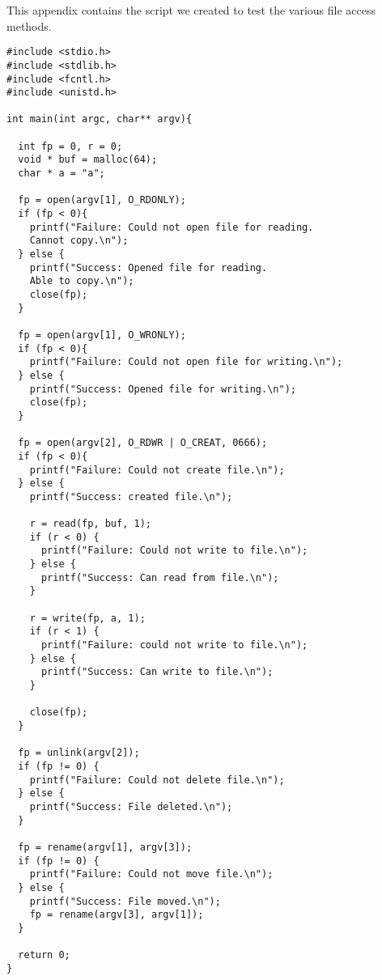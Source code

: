\label{app:A}



This appendix contains the script we created to test the various file access methods.
\selectfont
\begin{lstlisting}[style=CStyle]
#include <stdio.h>
#include <stdlib.h>
#include <fcntl.h>
#include <unistd.h>

int main(int argc, char** argv){

  int fp = 0, r = 0;
  void * buf = malloc(64);
  char * a = "a";

  fp = open(argv[1], O_RDONLY);
  if (fp < 0){
    printf("Failure: Could not open file for reading. 
    Cannot copy.\n");
  } else {
    printf("Success: Opened file for reading. 
    Able to copy.\n");
    close(fp);
  }

  fp = open(argv[1], O_WRONLY);
  if (fp < 0){
    printf("Failure: Could not open file for writing.\n");
  } else {
    printf("Success: Opened file for writing.\n");
    close(fp);
  }

  fp = open(argv[2], O_RDWR | O_CREAT, 0666);
  if (fp < 0){
    printf("Failure: Could not create file.\n");
  } else {
    printf("Success: created file.\n");

    r = read(fp, buf, 1);
    if (r < 0) {
      printf("Failure: Could not write to file.\n");
    } else {
      printf("Success: Can read from file.\n");
    }

    r = write(fp, a, 1);
    if (r < 1) {
      printf("Failure: could not write to file.\n");
    } else {
      printf("Success: Can write to file.\n");
    }

    close(fp);
  }

  fp = unlink(argv[2]);
  if (fp != 0) {
    printf("Failure: Could not delete file.\n");
  } else {
    printf("Success: File deleted.\n");
  }

  fp = rename(argv[1], argv[3]);
  if (fp != 0) {
    printf("Failure: Could not move file.\n");
  } else {
    printf("Success: File moved.\n");
    fp = rename(argv[3], argv[1]);
  }

  return 0;
}

\end{lstlisting}
